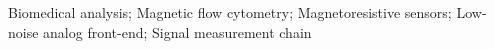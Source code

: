 
\noindent
Biomedical analysis; Magnetic flow cytometry; Magnetoresistive sensors; Low-noise analog front-end; Signal measurement chain